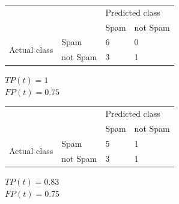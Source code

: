 \documentclass[a4paper]{article}
\theoremstyle{definition}
\newenvironment{soln}{
    \leavevmode\color{blue}\ignorespaces
}{}
\begin{document}
\begin{enumerate}
\begin{enumerate}
\begin{soln}
                  \begin{center}
                     \label{tab:title}
                    \begin{tabular}{l l | l l}
                                                    &          & \multicolumn{2}{l}{Predicted class}            \\
                                                    &          & Spam                                & not Spam \\
                      \hline
                      \multirow{2}{*}{Actual class} & Spam     & 6                                   & 0        \\
                                                    & not Spam & 3                                   & 1
                    \end{tabular}
                  \end{center}
                  $TP(t) = 1$\\
                  $FP(t) = 0.75$

                  \begin{center}
                     \label{tab:title}
                    \begin{tabular}{l l | l l}
                                                    &          & \multicolumn{2}{l}{Predicted class}            \\
                                                    &          & Spam                                & not Spam \\
                      \hline
                      \multirow{2}{*}{Actual class} & Spam     & 5                                   & 1        \\
                                                    & not Spam & 3                                   & 1
                    \end{tabular}
                  \end{center}
                  $TP(t) = 0.83 $\\
                  $FP(t) = 0.75$


\end{soln}
\end{enumerate}
\end{enumerate}
\end{document}
